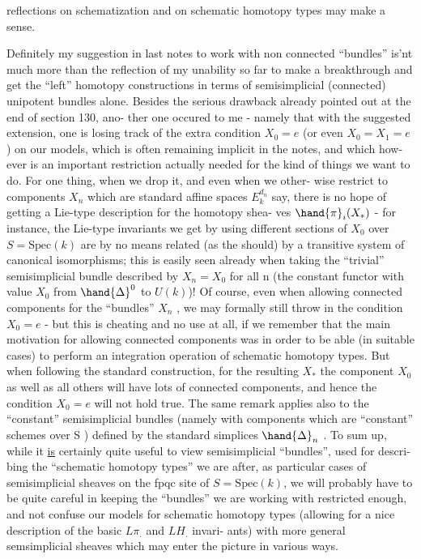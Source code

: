 reflections on schematization and on schematic homotopy types may make a
sense.

Definitely my suggestion in last notes\hand{,} to work with non connected
``bundles''\hand{,} is'nt much more than the reflection of my unability so far to
make a breakthrough and get the ``left'' homotopy constructions
in terms of semisimplicial (connected) unipotent bundles alone. Besides
the serious drawback already pointed out at the end of section 130, ano-%
ther one occured to me - namely that with the suggested extension, one
is losing track of the extra condition $X_0=e$ (or even $X_0=X_1=e$) on our
models, which is often remaining implicit in the notes, and which how-%
ever is an important restriction\hand{,} actually needed for the kind of things
we want to do. For one thing, when we drop it, and even when we other-%
wise restrict to components $X_n$ which are standard affine spaces $E^{d_n}_k$ say,
there is no hope of getting a Lie-type description for the homotopy shea-%
ves $\hand{\pi}_i(X_*)$ - for instance, the Lie-type invariants we get  by
using different sections of $X_0$ over $S=\mathrm{Spec}(k)$ are by no means related
(as the  should) by a transitive system of canonical isomorphisms; this
is easily seen already when taking the ``trivial'' semisimplicial bundle
described by $X_n=X_0$ for all n (the constant functor with value $X_0$ from
$\hand{\Delta}^0$ to $U(k)$)! Of course, even when allowing connected components for
the ``bundles'' $X_n$ , we may formally still throw in the condition $X_0=e$
- but this is cheating and no use at all, if we remember that the main
motivation for allowing connected components was in order to be able (in
suitable cases) to perform  an integration operation of
schematic homotopy types. But when following the standard construction,
for the resulting $X_*$ the component $X_0$ as well as all others will have
lots of connected components, and hence the condition $X_0=e$ will not
hold true. The same remark applies also to the ``constant'' semisimplicial
bundles (namely with  components which are ``constant'' schemes
over S ) defined by the standard simplices $\hand{\Delta}_n$ . To sum up, while it \uline{is}
certainly quite useful to view semisimplicial ``bundles'', used for descri-%
bing the ``schematic homotopy types'' we are after, as particular cases
of  semisimplicial sheaves on the fpqc site of $S=\mathrm{Spec}(k)$, we will probably
have to be quite careful in keeping the ``bundles'' we are working with
restricted enough, and not confuse our models for schematic homotopy
types (allowing for a nice description of the basic $L\pi_{.}$ and $LH_{.}$ invari-%
ants) with more general semsimplicial sheaves which may enter the picture
in various ways.

